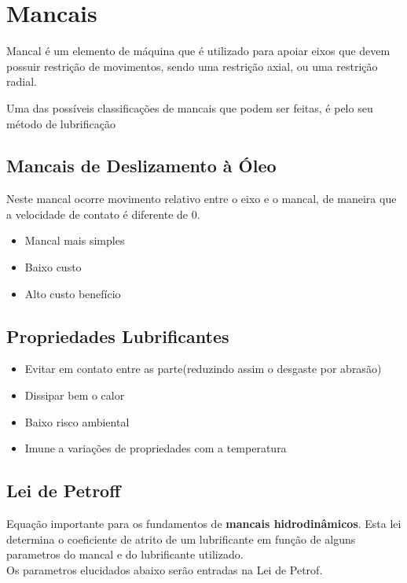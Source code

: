 \section{Mancais}

Mancal é um elemento de máquina que é utilizado para apoiar eixos que devem possuir restrição de movimentos, sendo uma restrição axial, ou uma restrição radial.

Uma das possíveis classificações de mancais que podem ser feitas, é pelo seu método de lubrificação

\subsection{Mancais de Deslizamento à Óleo}

Neste mancal ocorre movimento relativo entre o eixo e o mancal, de maneira que a velocidade de contato é diferente de 0.

\begin{itemize}
	\item Mancal mais simples
	\item Baixo custo
	\item Alto custo benefício
\end{itemize}

\subsection{Propriedades Lubrificantes}

\begin{itemize}
	\item Evitar em contato entre as parte(reduzindo assim o desgaste por abrasão)
	\item Dissipar bem o calor
	\item Baixo risco ambiental
	\item Imune a variações de propriedades com a temperatura
\end{itemize}

\subsection{Lei de Petroff}

Equação importante para os fundamentos de \textbf{mancais hidrodinâmicos}. Esta lei determina o coeficiente de atrito de um lubrificante em função de alguns parametros do mancal e do lubrificante utilizado.\\
Os parametros elucidados abaixo serão entradas na Lei de Petrof.

